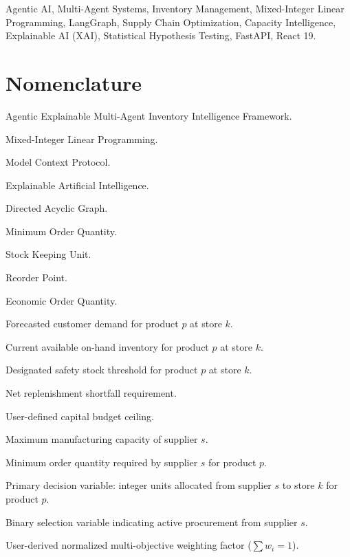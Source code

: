 \documentclass[conference]{IEEEtran}
\begin{document}
\begin{IEEEkeywords}
Agentic AI, Multi-Agent Systems, Inventory Management, Mixed-Integer Linear Programming, LangGraph, Supply Chain Optimization, Capacity Intelligence, Explainable AI (XAI), Statistical Hypothesis Testing, FastAPI, React 19.
\end{IEEEkeywords}

\section*{Nomenclature}
\begin{IEEEdescription}
\item[\textit{AEMIIF}] Agentic Explainable Multi-Agent Inventory Intelligence Framework.
\item[\textit{MILP}] Mixed-Integer Linear Programming.
\item[\textit{MCP}] Model Context Protocol.
\item[\textit{XAI}] Explainable Artificial Intelligence.
\item[\textit{DAG}] Directed Acyclic Graph.
\item[\textit{MOQ}] Minimum Order Quantity.
\item[\textit{SKU}] Stock Keeping Unit.
\item[\textit{ROP}] Reorder Point.
\item[\textit{EOQ}] Economic Order Quantity.
\item[$D_{pk}$] Forecasted customer demand for product $p$ at store $k$.
\item[$I_{pk}$] Current available on-hand inventory for product $p$ at store $k$.
\item[$SS_{pk}$] Designated safety stock threshold for product $p$ at store $k$.
\item[$Q_{req}$] Net replenishment shortfall requirement.
\item[$B$] User-defined capital budget ceiling.
\item[$C_s$] Maximum manufacturing capacity of supplier $s$.
\item[$MOQ_{sp}$] Minimum order quantity required by supplier $s$ for product $p$.
\item[$x_{spk}$] Primary decision variable: integer units allocated from supplier $s$ to store $k$ for product $p$.
\item[$y_{spk}$] Binary selection variable indicating active procurement from supplier $s$.
\item[$w_i$] User-derived normalized multi-objective weighting factor ($\sum w_i = 1$).
\end{IEEEdescription}
\end{document}

